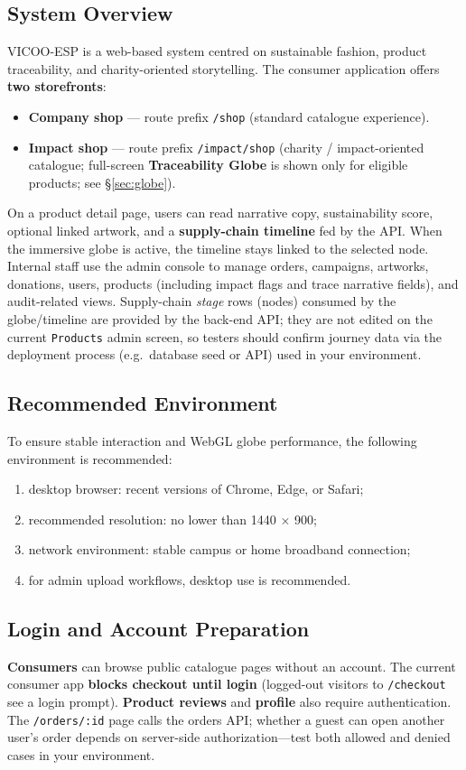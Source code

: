 \documentclass[11pt]{article}
\newcommand{\projectname}{VICOO-ESP}
\begin{document}
\subsection{System Overview}
\projectname{} is a web-based system centred on sustainable fashion, product traceability, and charity-oriented storytelling. The consumer application offers \textbf{two storefronts}:
\begin{itemize}[leftmargin=2.2em]
    \item \textbf{Company shop} --- route prefix \texttt{/shop} (standard catalogue experience).
    \item \textbf{Impact shop} --- route prefix \texttt{/impact/shop} (charity / impact-oriented catalogue; full-screen \textbf{Traceability Globe} is shown only for eligible products; see \S\ref{sec:globe}).
\end{itemize}
On a product detail page, users can read narrative copy, sustainability score, optional linked artwork, and a \textbf{supply-chain timeline} fed by the API. When the immersive globe is active, the timeline stays linked to the selected node. Internal staff use the admin console to manage orders, campaigns, artworks, donations, users, products (including impact flags and trace narrative fields), and audit-related views. Supply-chain \emph{stage} rows (nodes) consumed by the globe/timeline are provided by the back-end API; they are not edited on the current \texttt{Products} admin screen, so testers should confirm journey data via the deployment process (e.g.\ database seed or API) used in your environment.

\subsection{Recommended Environment}
To ensure stable interaction and WebGL globe performance, the following environment is recommended:
\begin{enumerate}[leftmargin=2.2em]
    \item desktop browser: recent versions of Chrome, Edge, or Safari;
    \item recommended resolution: no lower than 1440 $\times$ 900;
    \item network environment: stable campus or home broadband connection;
    \item for admin upload workflows, desktop use is recommended.
\end{enumerate}

\subsection{Login and Account Preparation}
\textbf{Consumers} can browse public catalogue pages without an account. The current consumer app \textbf{blocks checkout until login} (logged-out visitors to \texttt{/checkout} see a login prompt). \textbf{Product reviews} and \textbf{profile} also require authentication. The \texttt{/orders/:id} page calls the orders API; whether a guest can open another user's order depends on server-side authorization---test both allowed and denied cases in your environment.
\end{document}
